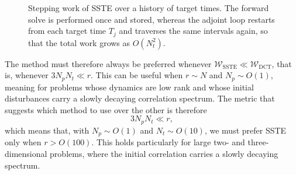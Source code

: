 \begin{figure}[t]
  \centering
  \caption{Stepping work of SSTE over a history of target times. The forward solve is performed
  once and stored, whereas the adjoint loop restarts from each target time \(T_j\) and traverses
  the same intervals again, so that the total work grows as \(O(N_t^{2})\).}
  \label{fig:sste_time_history_cost}
\end{figure}

The method must therefore always be preferred whenever
\(\mathcal{W}_{\mathrm{SSTE}}\ll\mathcal{W}_{\mathrm{DCT}}\), that is, whenever
\(3N_pN_t\ll r\). This can be useful when \(r\sim N\) and \(N_p\sim O(1)\), meaning for
problems whose dynamics are low rank and whose initial disturbances carry a slowly decaying
correlation spectrum. The metric that suggests which method to use over the other is therefore
\begin{equation}
  3N_pN_t\ll r ,
  \label{eq:sste_vs_dct_criterion}
\end{equation}
which means that, with \(N_p\sim O(1)\) and \(N_t\sim O(10)\), we must prefer SSTE only when
\(r>O(100)\). This holds particularly for large two- and three-dimensional problems, where the
initial correlation carries a slowly decaying spectrum.


